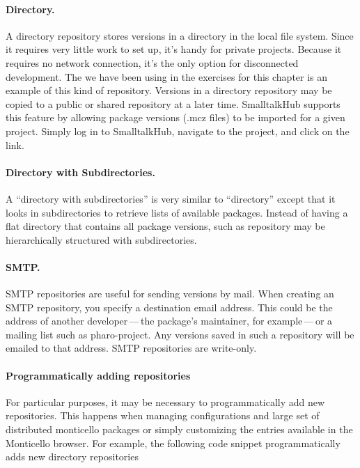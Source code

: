 \documentclass[a4paper,10pt,twoside]{book}
\begin{document}
\paragraph{Directory.} A directory repository stores versions in a directory in the local file system. Since it requires very little work to set up, it's handy for private projects. Because it requires no network connection, it's the only option for disconnected development. The  we have been using in the exercises for this chapter is an example of this kind of repository. Versions in a directory repository may be copied to a public or shared repository at a later time. SmalltalkHub supports this feature by allowing package versions (.mcz files) to be imported for a given project. Simply log in to SmalltalkHub, navigate to the project, and click on the  link.

\paragraph{Directory with Subdirectories.}  A ``directory with subdirectories'' is very similar to ``directory'' except that it looks in subdirectories to retrieve lists of available packages. Instead of having a flat directory that contains all package versions, such as repository may be hierarchically  structured with  subdirectories.

\paragraph{SMTP.} SMTP repositories are useful for sending versions by mail. When creating an SMTP repository, you specify a destination email address. This could be the address of another developer\,---\,the package's maintainer, for example\,---\,or a mailing list such as pharo-project. Any versions saved in such a repository will be emailed to that address.  SMTP repositories are write-only.

\paragraph{Programmatically adding repositories} For particular purposes, it may be necessary to programmatically add new repositories. This happens when managing configurations and large set of distributed monticello packages or simply customizing the entries available in the Monticello browser. For example, the following code snippet programmatically adds new directory repositories
\end{document}
